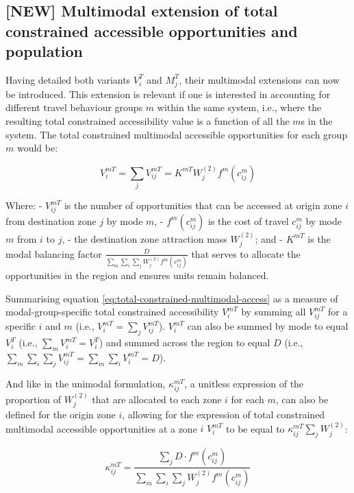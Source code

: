 \documentclass[
11pt, %
oneside, %
english, %
singlespacing, %
]{macthesis} %
\begin{document}
\subsection{{[}NEW{]} Multimodal extension of total constrained accessible opportunities and population}\label{new-multimodal-extension-of-total-constrained-accessible-opportunities-and-population}

Having detailed both variants \(V_i^T\) and \(M_j^T\), their multimodal extensions can now be introduced. This extension is relevant if one is interested in accounting for different travel behaviour groups \(m\) within the same system, i.e., where the resulting total constrained accessibility value is a function of all the \(m\)s in the system. The total constrained multimodal accessible opportunities for each group \(m\) would be:

\begin{equation}
\label{eq:total-constrained-multimodal-access}
V^{mT}_{i} = \sum_j V^{mT}_{ij} = K^{mT} W_j^{(2)} f^m(c^m_{ij})
\end{equation} 

Where:
- \(V^{mT}_{ij}\) is the number of opportunities that can be accessed at origin zone \(i\) from destination zone \(j\) by mode \(m\),
- \(f^m(c^m_{ij})\) is the cost of travel \(c^m_{ij}\) by mode \(m\) from \(i\) to \(j\),
- the destination zone attraction mass \(W_j^{(2)}\); and
- \(K^{mT}\) is the modal balancing factor \(\frac{D}{\sum_m\sum_i\sum_j W^{(2)}_jf^m(c^m_{ij})}\) that serves to allocate the opportunities in the region and ensures units remain balanced.

Summarising equation \ref{eq:total-constrained-multimodal-access} as a measure of modal-group-specific total constrained accessibility \(V^{mT}_i\) by summing all \(V^{mT}_{ij}\) for a specific \(i\) and \(m\) (i.e., \(V^{mT}_i = \sum_j V^{mT}_{ij}\)). \(V^{mT}_i\) can also be summed by mode to equal \(V^{T}_i\) (i.e., \(\sum_m V^{mT}_i = V^{T}_i\)) and summed across the region to equal \(D\) (i.e., \(\sum_m\sum_i\sum_j V^{mT}_{ij} = \sum_m\sum_i V^{mT}_{i} = D\)).

And like in the unimodal formulation, \(\kappa_{ij}^{mT}\), a unitless expression of the proportion of \(W^{(2)}_j\) that are allocated to each zone \(i\) for each \(m\), can also be defined for the origin zone \(i\), allowing for the expression of total constrained multimodal accessible opportunities at a zone \(i\) \(V^{mT}_i\) to be equal to \(\kappa_{ij}^{mT}\sum_j W^{(2)}_j\):

\[
\kappa_{ij}^{mT} = \frac{\sum_j D\cdot f^m(c^m_{ij})}{\sum_m\sum_i\sum_j W^{(2)}_jf^m(c^m_{ij})}
\]
\end{document}
